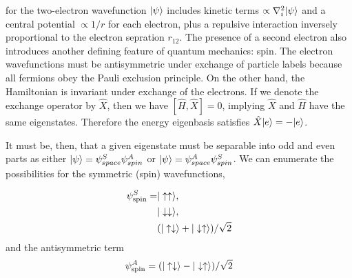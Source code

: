 	\noindent for the two-electron wavefunction $|\psi\rangle$ includes kinetic terms $\propto\nabla_i^2|\psi\rangle$ and a central potential $\propto 1/r$ for each electron, plus a repulsive interaction inversely proportional to the electron sepration $r_{12}$.
	The presence of a second electron also introduces another defining feature of quantum mechanics: spin.
	The electron wavefunctions must be antisymmetric under exchange of particle labels because all fermions obey the Pauli exclusion principle.
	On the other hand, the Hamiltonian is invariant under exchange of the electrons.
	If we denote the exchange operator by $\hat{X}$, then we have $[\hat{H},\hat{X}] = 0$, implying $\hat{X}$ and $\hat{H}$ have the same eigenstates.
	Therefore the energy eigenbasis satisfies $\hat{X}|e\rangle = -|e\rangle$.
	
	
	It must be, then, that a given eigenstate must be separable into odd and even parts as either $|\psi\rangle =  \psi^{S}_{space}\psi^{A}_{spin}$ or $|\psi\rangle=\psi^{A}_{space}\psi^{S}_{spin}$.
	We can enumerate the possibilities for the symmetric (spin) wavefunctions, 
	
	\begin{align}
	\psi^S_\text{spin} =& |\uparrow\uparrow\rangle,\\
		&|\downarrow\downarrow\rangle,\\
		&(|\uparrow\downarrow\rangle+|\downarrow\uparrow\rangle)/\sqrt{2}
	\end{align}
	 and the antisymmetric term
	\begin{equation}
	\psi^A_\text{spin} = (|\uparrow\downarrow\rangle-|\downarrow\uparrow\rangle)/\sqrt{2}
	\end{equation}

